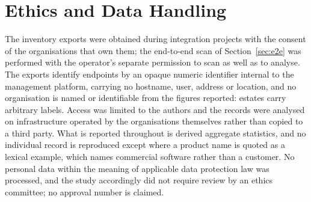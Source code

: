 \documentclass[fleqn,10pt,lineno]{wlpeerj}
\begin{document}
\section*{Ethics and Data Handling}
The inventory exports were obtained during integration projects with the consent of the organisations that own them; the end-to-end scan of Section~\ref{sec:e2e} was performed with the operator's separate permission to scan as well as to analyse. The exports identify endpoints by an opaque numeric identifier internal to the management platform, carrying no hostname, user, address or location, and no organisation is named or identifiable from the figures reported: estates carry arbitrary labels. Access was limited to the authors and the records were analysed on infrastructure operated by the organisations themselves rather than copied to a third party. What is reported throughout is derived aggregate statistics, and no individual record is reproduced except where a product name is quoted as a lexical example, which names commercial software rather than a customer. No personal data within the meaning of applicable data protection law was processed, and the study accordingly did not require review by an ethics committee; no approval number is claimed.
\end{document}
